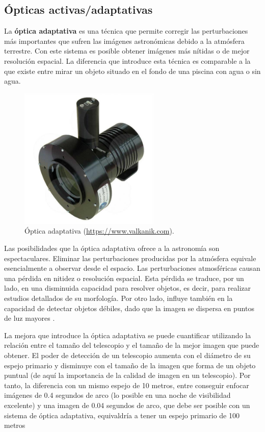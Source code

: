 \subsection{Ópticas activas/adaptativas}

La \textbf{óptica adaptativa} es una técnica que permite corregir las perturbaciones más importantes que sufren las imágenes astronómicas debido a la atmósfera terrestre. Con este sistema es posible obtener imágenes más nítidas o de mejor resolución espacial. La diferencia que introduce esta técnica es comparable a la que existe entre mirar un objeto situado en el fondo de una piscina con agua o sin agua.

\bigskip
\begin{figure}[!ht]
  \begin{center}
  \includegraphics[width=0.6\textwidth]{../images/optica.jpg}
  \caption[Óptica adaptativa]{Óptica adaptativa (\href{https://www.valkanik.com}{https://www.valkanik.com}).}
  \label{fig:diag_scrum}
  \end{center}
\end{figure}


\bigskip
Las posibilidades que la óptica adaptativa ofrece a la astronomía son espectaculares. Eliminar las perturbaciones producidas por la atmósfera equivale esencialmente a observar desde el espacio. Las perturbaciones atmosféricas causan una pérdida en nitidez o resolución espacial. Esta pérdida se traduce, por un lado, en una disminuida capacidad para resolver objetos, es decir, para realizar estudios detallados de su morfología. Por otro lado, influye también en la capacidad de detectar objetos débiles, dado que la imagen se dispersa en puntos de luz mayores \cite{OA}.

\bigskip
La mejora que introduce la óptica adaptativa se puede cuantificar utilizando la relación entre el tamaño del telescopio y el tamaño de la mejor imagen que puede obtener. El poder de detección de un telescopio aumenta con el diámetro de su espejo primario y disminuye con el tamaño de la imagen que forma de un objeto puntual (de aquí la importancia de la calidad de imagen en un telescopio). Por tanto, la diferencia con un mismo espejo de 10 metros, entre conseguir enfocar imágenes de 0.4 segundos de arco (lo posible en una noche de visibilidad excelente) y una imagen de 0.04 segundos de arco, que debe ser posible con un sistema de óptica adaptativa, equivaldría a tener un espejo primario de 100 metros

